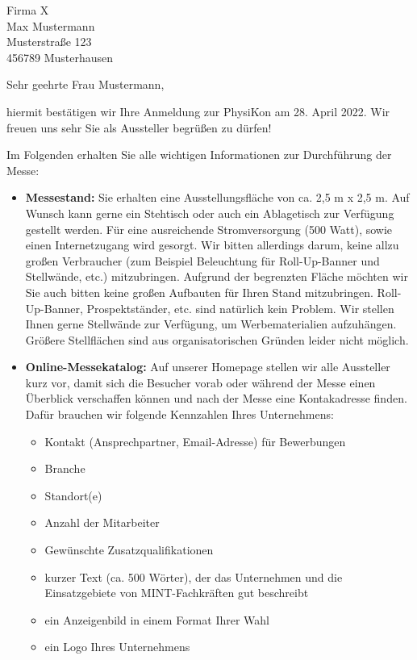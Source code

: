 \documentclass[
  pepbrief,
  fontsize=12pt,
  paper=a4,
  DIV=14,
  parskip=half,
  backaddress=false,
]{scrlttr2}
\author{Lena Linhoff}
\begin{document}
\begin{letter}{%
  Firma X\\
  Max Mustermann\\
  Musterstraße 123\\
  456789 Musterhausen

}
\opening{Sehr geehrte Frau Mustermann,}
hiermit bestätigen wir Ihre Anmeldung zur PhysiKon am 28. April 2022. Wir freuen uns sehr Sie als Aussteller begrüßen zu dürfen!

Im Folgenden erhalten Sie alle wichtigen Informationen zur Durchführung der Messe:

\begin{itemize}
  \item \textbf{Messestand:} Sie erhalten eine Ausstellungsfläche von ca. 2,5 m x 2,5 m.
    Auf Wunsch kann gerne ein Stehtisch oder auch ein Ablagetisch zur Verfügung gestellt werden.
    Für eine ausreichende Stromversorgung (500 Watt), sowie einen Internetzugang wird gesorgt.
    Wir bitten allerdings darum, keine allzu großen Verbraucher (zum Beispiel Beleuchtung für Roll-Up-Banner und Stellwände, etc.) mitzubringen.
    Aufgrund der begrenzten Fläche möchten wir Sie auch bitten keine großen Aufbauten für Ihren Stand mitzubringen.
    Roll-Up-Banner, Prospektständer, etc. sind natürlich kein Problem.
    Wir stellen Ihnen gerne Stellwände zur Verfügung, um Werbematerialien aufzuhängen.
    Größere Stellflächen sind aus organisatorischen Gründen leider nicht möglich.
    \item \textbf{Online-Messekatalog:}
    Auf unserer Homepage stellen wir alle Aussteller kurz vor, damit sich die Besucher vorab oder während der Messe einen Überblick verschaffen können und nach der Messe eine Kontakadresse finden.
    Dafür brauchen wir folgende Kennzahlen Ihres Unternehmens:
    \begin{itemize}
      \item Kontakt (Ansprechpartner, Email-Adresse) für Bewerbungen
      \item Branche
      \item Standort(e)
      \item Anzahl der Mitarbeiter
      \item Gewünschte Zusatzqualifikationen
      \item kurzer Text (ca. 500 Wörter), der das Unternehmen und die Einsatzgebiete von MINT-Fachkräften gut beschreibt
      \item ein Anzeigenbild in einem Format Ihrer Wahl
      \item ein Logo Ihres Unternehmens
    \end{itemize}


\end{itemize}
\end{letter}
\end{document}
